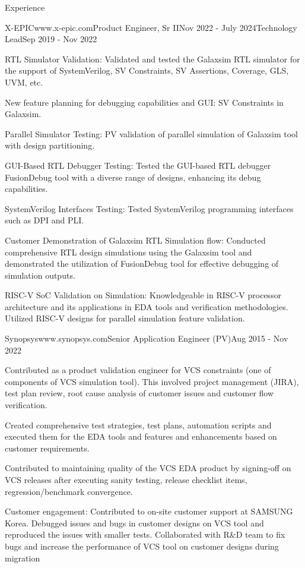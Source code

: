 \documentclass[
11pt, %
]{./assets/resume} %
\begin{document}
\begin{rSection}{Experience}
	\begin{rSubsectionM}{X-EPIC}{www.x-epic.com}{Product Engineer, Sr II}{Nov 2022 - July 2024}{Technology Lead}{Sep 2019 - Nov 2022}{}{}
		\item RTL Simulator Validation: Validated and tested the Galaxsim RTL simulator for the support of SystemVerilog, SV Constraints, SV Assertions, Coverage, GLS, UVM, etc.
		\item New feature planning for debugging capabilities and GUI: SV Constraints in Galaxsim.
		\item Parallel Simulator Testing: PV validation of parallel simulation of Galaxsim tool with design partitioning.
		\item GUI-Based RTL Debugger Testing: Tested the GUI-based RTL debugger FusionDebug tool with a diverse range of designs, enhancing its debug capabilities.
		\item SystemVerilog Interfaces Testing: Tested SystemVerilog programming interfaces such as DPI and PLI. 
		\item Customer Demonstration of Galaxsim RTL Simulation flow: Conducted comprehensive RTL design simulations using the Galaxsim tool and demonstrated the utilization of FusionDebug tool for effective debugging of simulation outputs.
		\item RISC-V SoC Validation on Simulation: Knowledgeable in RISC-V processor architecture and its applications in EDA tools and verification methodologies. Utilized RISC-V designs for parallel simulation feature validation.
	\end{rSubsectionM}
	\begin{rSubsectionX}{Synopsys}{www.synopsys.com}{Senior Application Engineer (PV)}{Aug 2015 - Nov 2022}
		\item Contributed as a product validation engineer for VCS constraints (one of components of VCS simulation tool). This involved project management (JIRA), test plan review, root cause analysis of customer issues and customer flow verification.
		\item Created comprehensive test strategies, test plans, automation scripts and executed them for the EDA tools and features and enhancements based on customer requirements.
		\item Contributed to maintaining quality of the VCS EDA product by signing-off on VCS releases after executing sanity testing, release checklist items, regression/benchmark convergence.
		\item Customer engagement: Contributed to on-site customer support at SAMSUNG Korea. Debugged issues and bugs in customer designs on VCS tool and reproduced the issues with smaller tests. Collaborated with R\&D team to fix bugs and increase the performance of VCS tool on customer designs during migration

\end{rSubsectionX}
\end{rSection}
\end{document}
